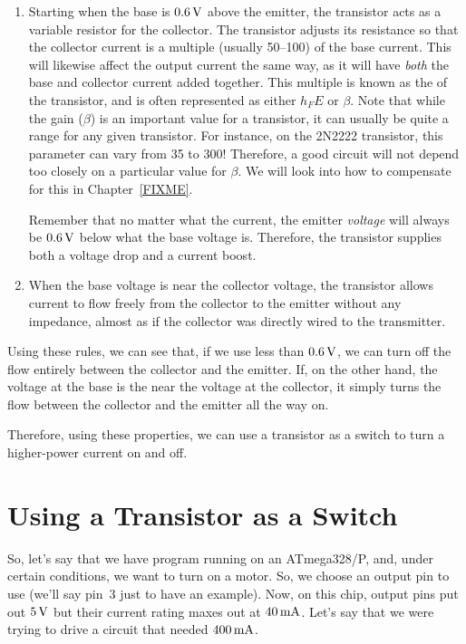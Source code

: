 {\begin{enumerate}
\item Starting when the base is $0.6\,\si{\volt}$ above the emitter, the transistor acts as a variable resistor for the collector.
The transistor adjusts its resistance so that the collector current is a multiple (usually 50--100) of the base current.
This will likewise affect the output current the same way, as it will have \emph{both} the base and collector current added together.
This multiple is known as the  of the transistor, and is often represented as either $h_FE$ or $\beta$.
Note that while the gain ($\beta$) is an important value for a transistor, it can usually be quite a range for any given transistor.
For instance, on the 2N2222 transistor, this parameter can vary from 35 to 300!
Therefore, a good circuit will not depend too closely on a particular value for $\beta$.
We will look into how to compensate for this in Chapter~\ref{FIXME}.

Remember that no matter what the current, the emitter \emph{voltage} will always be $0.6\,\si{\volt}$ below what the base voltage is.
Therefore, the transistor supplies both a voltage drop and a current boost.

\item When the base voltage is near the collector voltage, the transistor allows current to flow freely from the collector to the emitter without any impedance, almost as if the collector was directly wired to the transmitter.
\end{enumerate}

Using these rules, we can see that, if we use less than $0.6\,\si{\volt}$, we can turn off the flow entirely between the collector and the emitter.
If, on the other hand, the voltage at the base is the near the voltage at the collector, it simply turns the flow between the collector and the emitter all the way on.

Therefore, using these properties, we can use a transistor as a switch to turn a higher-power current on and off.

\section{Using a Transistor as a Switch}

So, let's say that we have program running on an ATmega328/P, and, under certain conditions, we want to turn on a motor.
So, we choose an output pin to use (we'll say pin~3 just to have an example).
Now, on this chip, output pins put out $5\,\si{\volt}$ but their current rating maxes out at $40\,\si{\milli\ampere}$.
Let's say that we were trying to drive a circuit that needed $400\,\si{\milli\ampere}$.

}
